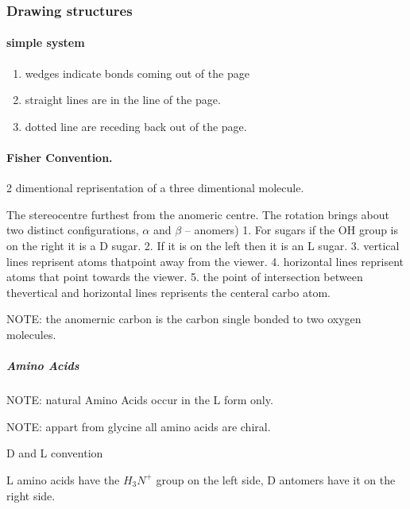 \documentclass[]{article}
\providecommand{\tightlist}{%
  \setlength{\itemsep}{0pt}\setlength{\parskip}{0pt}}
\let\oldparagraph\paragraph
\renewcommand{\paragraph}[1]{\oldparagraph{#1}\mbox{}}
\let\oldsubparagraph\subparagraph
\renewcommand{\subparagraph}[1]{\oldsubparagraph{#1}\mbox{}}
\begin{document}
\hypertarget{drawing-structures}{%
\subsubsection{Drawing structures}\label{drawing-structures}}

\hypertarget{simple-system}{%
\paragraph{simple system}\label{simple-system}}

\begin{enumerate}
\def\labelenumi{\arabic{enumi}.}
\tightlist
\item
  wedges indicate bonds coming out of the page
\item
  straight lines are in the line of the page.
\item
  dotted line are receding back out of the page.
\end{enumerate}

\hypertarget{fisher-convention.}{%
\paragraph{Fisher Convention.}\label{fisher-convention.}}

2 dimentional reprisentation of a three dimentional molecule.

The stereocentre furthest from the anomeric centre. The rotation brings
about two distinct configurations, \(\alpha\) and \(\beta\) -- anomers)
1. For sugars if the OH group is on the right it is a D sugar. 2. If it
is on the left then it is an L sugar. 3. vertical lines reprisent atoms
thatpoint away from the viewer. 4. horizontal lines reprisent atoms that
point towards the viewer. 5. the point of intersection between
thevertical and horizontal lines reprisents the centeral carbo atom.

NOTE: the anomernic carbon is the carbon single bonded to two oxygen
molecules.

\hypertarget{amino-acids}{%
\subparagraph{Amino Acids}\label{amino-acids}}

NOTE: natural Amino Acids occur in the L form only.

NOTE: appart from glycine all amino acids are chiral.

D and L convention

L amino acids have the \(H_3N^{+}\) group on the left side, D antomers
have it on the right side.
\end{document}
